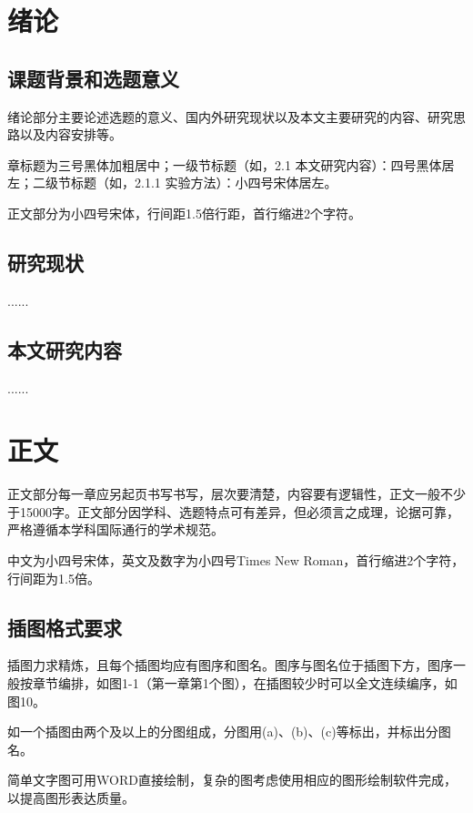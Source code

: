 
\xiaosihao\songti
\begin{spacing}{1.5}
    \newpage
    \setcounter{page}{1}
    \section{绪论}
    
    \subsection{课题背景和选题意义}
    绪论部分主要论述选题的意义、国内外研究现状以及本文主要研究的内容、研究思路以及内容安排等。
    
    章标题为三号黑体加粗居中；一级节标题（如，2.1 本文研究内容）：四号黑体居左；二级节标题（如，2.1.1 实验方法）：小四号宋体居左。
    
    正文部分为小四号宋体，行间距1.5倍行距，首行缩进2个字符。
    
    \subsection{研究现状}
    ......
    \subsection{本文研究内容}
    ......
    \newpage
    \section{正文}
    
    正文部分每一章应另起页书写书写，层次要清楚，内容要有逻辑性，正文一般不少于15000字。正文部分因学科、选题特点可有差异，但必须言之成理，论据可靠，严格遵循本学科国际通行的学术规范。
    
    中文为小四号宋体，英文及数字为小四号Times New Roman，首行缩进2个字符，行间距为1.5倍。
    
    \subsection{插图格式要求}
    插图力求精炼，且每个插图均应有图序和图名。图序与图名位于插图下方，图序一般按章节编排，如图1-1（第一章第1个图），在插图较少时可以全文连续编序，如图10。

    如一个插图由两个及以上的分图组成，分图用(a)、(b)、(c)等标出，并标出分图名。

    简单文字图可用WORD直接绘制，复杂的图考虑使用相应的图形绘制软件完成，以提高图形表达质量。


\end{spacing}
